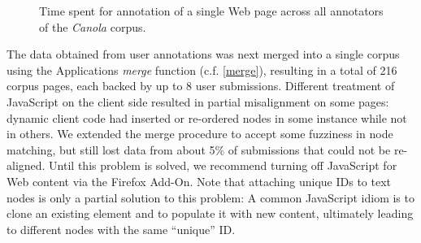 \begin{figure}[h]
\centering
{}
\label{f:userstats}
\caption{Time spent for annotation of a single Web page across all annotators of the \textit{Canola} corpus.}
\end{figure}

The data obtained from user annotations was next merged into a single corpus using the Applications \textit{merge} function (c.f. \ref{merge}), resulting in a total of 216 corpus pages, each backed by up to 8 user submissions.
Different treatment of JavaScript on the client side resulted in partial misalignment on some pages:
dynamic client code had inserted or re-ordered nodes in some instance while not in others.
We extended the merge procedure to accept some fuzziness in node matching, but still lost data from about 5\% of submissions that could not be re-aligned.
Until this problem is solved, we recommend turning off JavaScript for Web content via the Firefox Add-On.
Note that attaching unique IDs to text nodes is only a partial solution to this problem:
A common JavaScript idiom is to clone an existing element and to populate it with new content, ultimately leading to different nodes with the same ``unique'' ID. 


